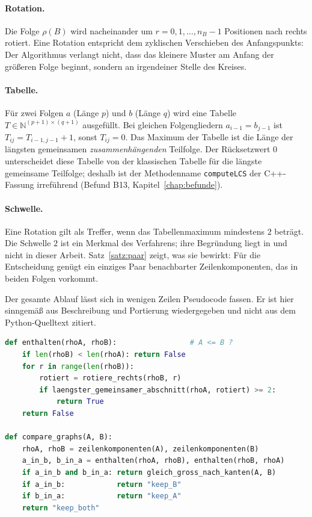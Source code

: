 \paragraph{Rotation.} Die Folge $\rho(B)$ wird nacheinander um $r=0,1,\ldots,n_B-1$ Positionen nach rechts rotiert. Eine Rotation entspricht dem zyklischen Verschieben des Anfangspunkts: Der Algorithmus verlangt nicht, dass das kleinere Muster am Anfang der größeren Folge beginnt, sondern an irgendeiner Stelle des Kreises.

\paragraph{Tabelle.} Für zwei Folgen $a$ (Länge $p$) und $b$ (Länge $q$) wird eine Tabelle $T\in\mathbb{N}^{(p+1)\times(q+1)}$ ausgefüllt. Bei gleichen Folgengliedern $a_{i-1}=b_{j-1}$ ist $T_{ij}=T_{i-1,j-1}+1$, sonst $T_{ij}=0$. Das Maximum der Tabelle ist die Länge der längsten gemeinsamen \emph{zusammenhängenden} Teilfolge. Der Rücksetzwert $0$ unterscheidet diese Tabelle von der klassischen Tabelle für die längste gemeinsame Teilfolge; deshalb ist der Methodenname \texttt{computeLCS} der C++-Fassung irreführend (Befund B13, Kapitel~\ref{chap:befunde}).

\paragraph{Schwelle.} Eine Rotation gilt als Treffer, wenn das Tabellenmaximum mindestens $2$ beträgt. Die Schwelle $2$ ist ein Merkmal des Verfahrens; ihre Begründung liegt in \cite{epp2026subgraph} und nicht in dieser Arbeit. Satz~\ref{satz:paar} zeigt, was sie bewirkt: Für die Entscheidung genügt ein einziges Paar benachbarter Zeilenkomponenten, das in beiden Folgen vorkommt.

Der gesamte Ablauf lässt sich in wenigen Zeilen Pseudocode fassen. Er ist hier sinngemäß aus Beschreibung und Portierung wiedergegeben und nicht aus dem Python-Quelltext zitiert.

\begin{lstlisting}[language=Python, caption={Ablauf von \texttt{compare\_graphs} (Pseudocode, sinngemäß)}, label={lst:py_ablauf}]
def enthalten(rhoA, rhoB):                 # A <= B ?
    if len(rhoB) < len(rhoA): return False
    for r in range(len(rhoB)):
        rotiert = rotiere_rechts(rhoB, r)
        if laengster_gemeinsamer_abschnitt(rhoA, rotiert) >= 2:
            return True
    return False

def compare_graphs(A, B):
    rhoA, rhoB = zeilenkomponenten(A), zeilenkomponenten(B)
    a_in_b, b_in_a = enthalten(rhoA, rhoB), enthalten(rhoB, rhoA)
    if a_in_b and b_in_a: return gleich_gross_nach_kanten(A, B)
    if a_in_b:            return "keep_B"
    if b_in_a:            return "keep_A"
    return "keep_both"
\end{lstlisting}

